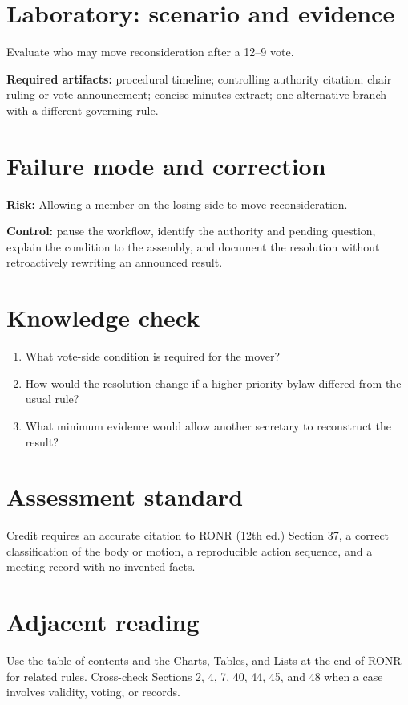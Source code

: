 \documentclass[11pt]{article}
\begin{document}
\section{Laboratory: scenario and evidence}
Evaluate who may move reconsideration after a 12–9 vote.

\textbf{Required artifacts:} procedural timeline; controlling authority citation; chair ruling or vote announcement; concise minutes extract; one alternative branch with a different governing rule.

\section{Failure mode and correction}
\textbf{Risk:} Allowing a member on the losing side to move reconsideration.

\textbf{Control:} pause the workflow, identify the authority and pending question, explain the condition to the assembly, and document the resolution without retroactively rewriting an announced result.

\section{Knowledge check}
\begin{enumerate}[leftmargin=*,itemsep=4pt]
\item What vote-side condition is required for the mover?
\item How would the resolution change if a higher-priority bylaw differed from the usual rule?
\item What minimum evidence would allow another secretary to reconstruct the result?
\end{enumerate}

\section{Assessment standard}
Credit requires an accurate citation to RONR (12th ed.) Section 37, a correct classification of the body or motion, a reproducible action sequence, and a meeting record with no invented facts.

\section{Adjacent reading}
Use the table of contents and the Charts, Tables, and Lists at the end of RONR for related rules. Cross-check Sections 2, 4, 7, 40, 44, 45, and 48 when a case involves validity, voting, or records.
\end{document}
